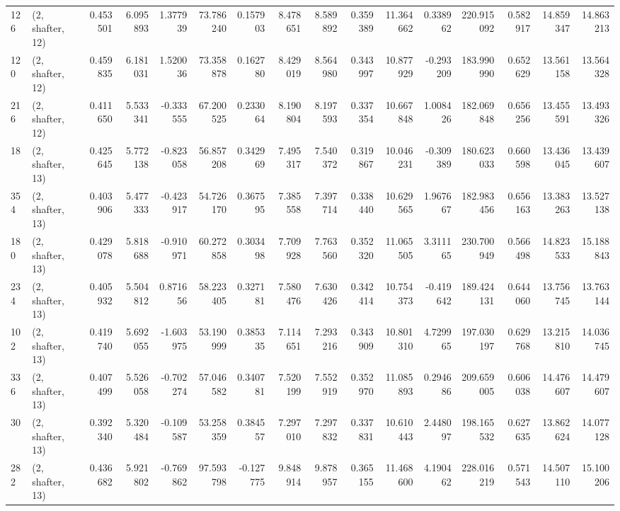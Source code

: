 \begin{tabular}{llrrrrrrrrrrrrrr}
126 &  (2, shafter, 12) &   0.453501 &   6.095893 &   1.377939 &    73.786240 &   0.157903 &   8.478651 &   8.589892 &  0.359389 &  11.364662 &   0.338962 &   220.915092 &  0.582917 &  14.859347 &  14.863213 \\
120 &  (2, shafter, 12) &   0.459835 &   6.181031 &   1.520036 &    73.358878 &   0.162780 &   8.429019 &   8.564980 &  0.343997 &  10.877929 &  -0.293209 &   183.990990 &  0.652629 &  13.561158 &  13.564328 \\
216 &  (2, shafter, 12) &   0.411650 &   5.533341 &  -0.333555 &    67.200525 &   0.233064 &   8.190804 &   8.197593 &  0.337354 &  10.667848 &   1.008426 &   182.069848 &  0.656256 &  13.455591 &  13.493326 \\
18  &  (2, shafter, 13) &   0.425645 &   5.772138 &  -0.823058 &    56.857208 &   0.342969 &   7.495317 &   7.540372 &  0.319867 &  10.046231 &  -0.309389 &   180.623033 &  0.660598 &  13.436045 &  13.439607 \\
354 &  (2, shafter, 13) &   0.403906 &   5.477333 &  -0.423917 &    54.726170 &   0.367595 &   7.385558 &   7.397714 &  0.338440 &  10.629565 &   1.967667 &   182.983456 &  0.656163 &  13.383263 &  13.527138 \\
180 &  (2, shafter, 13) &   0.429078 &   5.818688 &  -0.910971 &    60.272858 &   0.303498 &   7.709928 &   7.763560 &  0.352320 &  11.065505 &   3.311165 &   230.700949 &  0.566498 &  14.823533 &  15.188843 \\
234 &  (2, shafter, 13) &   0.405932 &   5.504812 &   0.871656 &    58.223405 &   0.327181 &   7.580476 &   7.630426 &  0.342414 &  10.754373 &  -0.419642 &   189.424131 &  0.644060 &  13.756745 &  13.763144 \\
102 &  (2, shafter, 13) &   0.419740 &   5.692055 &  -1.603975 &    53.190999 &   0.385335 &   7.114651 &   7.293216 &  0.343909 &  10.801310 &   4.729965 &   197.030197 &  0.629768 &  13.215810 &  14.036745 \\
336 &  (2, shafter, 13) &   0.407499 &   5.526058 &  -0.702274 &    57.046582 &   0.340781 &   7.520199 &   7.552919 &  0.352970 &  11.085893 &   0.294686 &   209.659005 &  0.606038 &  14.476607 &  14.479607 \\
30  &  (2, shafter, 13) &   0.392340 &   5.320484 &  -0.109587 &    53.258359 &   0.384557 &   7.297010 &   7.297832 &  0.337831 &  10.610443 &   2.448097 &   198.165532 &  0.627635 &  13.862624 &  14.077128 \\
282 &  (2, shafter, 13) &   0.436682 &   5.921802 &  -0.769862 &    97.593798 &  -0.127775 &   9.848914 &   9.878957 &  0.365155 &  11.468600 &   4.190462 &   228.016219 &  0.571543 &  14.507110 &  15.100206 \\

\end{tabular}
